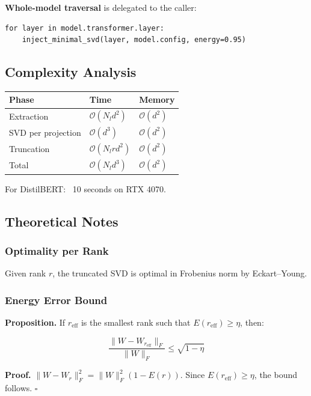 \textbf{Whole-model traversal} is delegated to the caller:

\begin{lstlisting}
for layer in model.transformer.layer:
    inject_minimal_svd(layer, model.config, energy=0.95)
\end{lstlisting}

\subsection{Complexity Analysis}

\begin{table}[H]
\centering
\small
\begin{tabular}{lll}
\toprule
\textbf{Phase} & \textbf{Time} & \textbf{Memory} \\
\midrule
Extraction & $\mathcal{O}(N_l d^2)$ & $\mathcal{O}(d^2)$ \\
SVD per projection & $\mathcal{O}(d^3)$ & $\mathcal{O}(d^2)$ \\
Truncation & $\mathcal{O}(N_l r d^2)$ & $\mathcal{O}(d^2)$ \\
Total & $\mathcal{O}(N_l d^3)$ & $\mathcal{O}(d^2)$ \\
\bottomrule
\end{tabular}
\end{table}

For DistilBERT: ~10 seconds on RTX 4070.

\subsection{Theoretical Notes}

\subsubsection{Optimality per Rank}

Given rank $r$, the truncated SVD is optimal in Frobenius norm by 
Eckart--Young.

\subsubsection{Energy Error Bound}

\textbf{Proposition.} If $r_\text{eff}$ is the smallest rank such that 
$E(r_\text{eff}) \geq \eta$, then:

\[
\frac{\|W - W_{r_\text{eff}}\|_F}{\|W\|_F} \leq \sqrt{1 - \eta}
\tag{4.9}
\]

\textbf{Proof.} $\|W - W_r\|_F^2 = \|W\|_F^2(1 - E(r))$. Since 
$E(r_\text{eff}) \geq \eta$, the bound follows. $\square$

